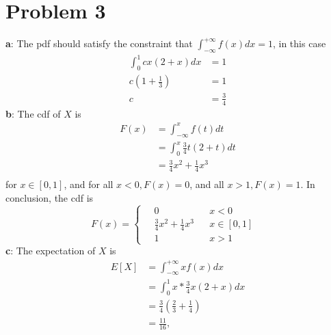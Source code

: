\documentclass[12pt,letterpaper]{article}
\begin{document}
\section*{Problem 3}
    \textbf{a}: The pdf should satisfy the constraint that $\int_{-\infty}^{+\infty} f(x)dx = 1$, in this case
        \begin{equation*}
            \begin{aligned}
                \int_{0}^{1} cx(2 + x) dx &= 1 \\
                c(1 + \frac{1}{3}) &= 1 \\
                c &= \frac{3}{4}
            \end{aligned}
        \end{equation*}
    \textbf{b}: The cdf of $X$ is
        \begin{equation*}
            \begin{aligned}
                F(x) &= \int_{-\infty}^{x} f(t)dt \\
                &= \int_{0}^{x} \frac{3}{4} t(2+t)dt \\
                &= \frac{3}{4}x^{2} + \frac{1}{4}x^{3} \\
            \end{aligned}
        \end{equation*}
    for $x \in [0, 1]$, and for all $x < 0, F(x) = 0$, and all $x > 1, F(x) = 1$. In conclusion, the cdf is
        \begin{equation*}
            F(x) = \left\{
                \begin{aligned}
                    &\ 0 & & x < 0 & \\
                    &\ \frac{3}{4}x^{2} + \frac{1}{4}x^{3} & & x \in [0, 1] & \\
                    &\ 1 & & x > 1 &
                \end{aligned}
                \right.
        \end{equation*}
    \textbf{c}: The expectation of $X$ is
        \begin{equation*}
            \begin{aligned}
                E[X] &= \int_{-\infty}^{+\infty} xf(x)dx \\
                &= \int_{0}^{1} x * \frac{3}{4} x(2+x)dx \\
                &= \frac{3}{4}(\frac{2}{3} + \frac{1}{4}) \\
                &= \frac{11}{16},
            \end{aligned}
        \end{equation*}
\end{document}

